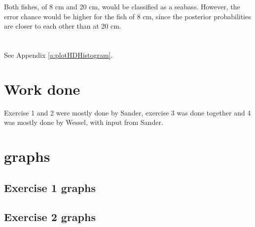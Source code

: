 \documentclass[10pt,a4paper]{article}
\begin{document}
\section{}
\subsection{}
\subsection{}
Both fishes, of 8 cm and 20 cm, would be classified as a seabass. However, the error chance would be higher for the fish of 8 cm, since the posterior probabilities are closer to each other than at 20 cm.

\section{}
\subsection{}
See Appendix \ref{a:plotHDHistogram}.
\subsection{}

\section{Work done}
Exercise 1 and 2 were mostly done by Sander, exercise 3 was done together and 4 was mostly done by Wessel, with input from Sander.

\appendix
\section{graphs}
\subsection{Exercise 1 graphs}

\subsection{Exercise 2 graphs}
\end{document}
